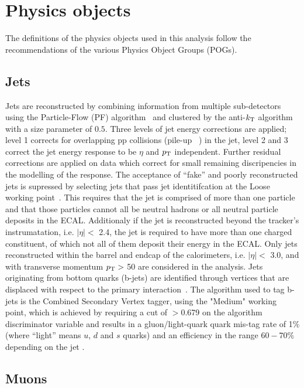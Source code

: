 \clearpage
\section{Physics objects\label{sec:reconstruction}}

The definitions of the physics objects used in this analysis follow
the recommendations of the various Physics Object Groups (POGs).

\subsection{Jets}

Jets are reconstructed by combining information from multiple
sub-detectors using the Particle-Flow (PF) algorithm~\cite{PAS-PFT-09-001} 
and clustered by the anti-$k_{\rm T}$ algorithm~\cite{antikt} with
a size parameter of $0.5$. Three levels of jet energy corrections are 
applied; level 1 corrects for overlapping pp collisions 
(pile-up ~\cite{Cacciari2008119,1126-6708-2008-04-005}) in the jet, 
level 2 and 3 correct the jet energy response to be $\eta$ and $p_{\mathrm{T}}$ independent.  
Further residual corrections are applied on data which correct for 
small remaining discripencies in the modelling of the response. The acceptance of
``fake''  and poorly reconstructed jets is supressed by selecting jets that pass 
jet identitifcation at the Loose working point~\cite{ref:jet-id}. This requires 
that the jet is comprised of more than one particle and that those particles 
cannot all be neutral hadrons or all neutral particle deposits in the ECAL. 
Additionaly if the jet is reconstructed beyond the tracker's instrumatation, 
i.e. $|\eta| <$ 2.4,  the jet is required to have more than one charged constituent, 
of which not all of them deposit their energy in the ECAL. 
Only jets reconstructed within the barrel and endcap of the calorimeters,
i.e. $|\eta| <$ 3.0, and with transverse momentum $p_{\mathrm{T}} >$ 50\gev  
are considered in the analysis. Jets originating from bottom quarks 
(b-jets) are identified through vertices that are displaced with respect to the primary 
interaction~\cite{CMS-PAS-BTV-12-001}. The algorithm used to tag b-jets 
is the Combined Secondary Vertex tagger, using the "Medium" working point, 
which is achieved by requiring a cut of $>$0.679 on the algorithm discriminator 
variable and results in a gluon/light-quark quark mis-tag rate of 1\% 
(where ``light'' means $u$, $d$ and $s$ quarks) and an efficiency in the 
range $60-70\%$ depending on the jet \pt. 

\subsection{Muons}

